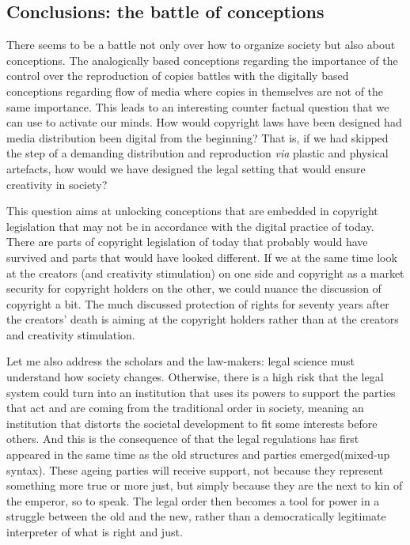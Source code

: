 \subsection{Conclusions: the battle of conceptions}
\label{ss:darling_conceptions:darling_conceptions:conclusions}

There seems to be a battle not only over how to organize society but also about
conceptions. The analogically based conceptions regarding the importance of the
control over the reproduction of copies battles with the digitally based
conceptions regarding f\hbox{}low of media where copies in themselves are not of the
same importance. This leads to an interesting counter factual question that we
can use to activate our minds. How would copyright laws have been designed had
media distribution been digital from the beginning? That is, if we had skipped
the step of a demanding distribution and reproduction \textit{via} plastic and
physical artefacts, how would we have designed the legal setting that would
ensure creativity in society? 

This question aims at unlocking conceptions that are embedded in copyright
legislation that may not be in accordance with the digital practice of today.
There are parts of copyright legislation of today that probably would have
survived and parts that would have looked dif\hbox{}ferent. If we at the same time look
at the creators (and creativity stimulation) on one side and copyright as a
market security for copyright holders on the other, we could nuance the
discussion of copyright a bit. The much discussed protection of rights for
seventy years after the creators' death is aiming at the copyright holders
rather than at the creators and creativity stimulation. 

Let me also address the scholars and the law-makers: legal science must
understand how society changes. Otherwise, there is a high risk that the legal
system could turn into an institution that uses its powers to support the
parties that act and are coming from the traditional order in society, meaning
an institution that distorts the societal development to f\hbox{}it some interests
before others. And this is the consequence of that the legal regulations has
f\hbox{}irst appeared in the same time as the old structures and parties
emerged(mixed-up syntax). These ageing parties will receive support, not because
they represent something more true or more just, but simply because they are the
next to kin of the emperor, so to speak. The legal order then becomes a tool for
power in a struggle between the old and the new, rather than a democratically
legitimate interpreter of what is right and just.

